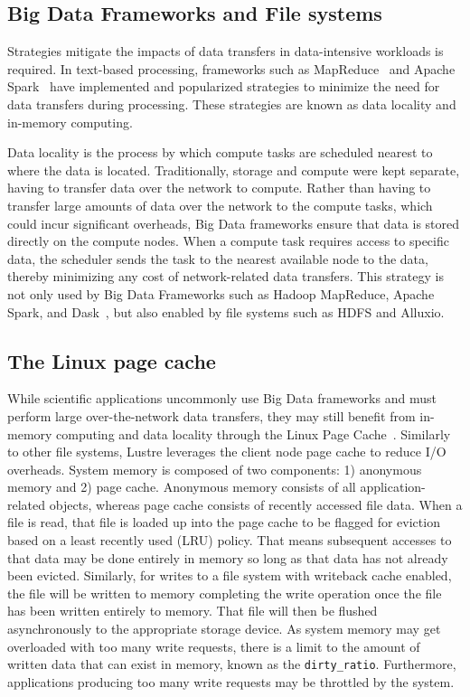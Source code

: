 \documentclass[10pt,journal,compsoc]{IEEEtran}
\begin{document}
\subsection{Big Data Frameworks and File systems}

      Strategies mitigate the impacts of data transfers in data-intensive workloads is
      required. In text-based processing, frameworks such as
      MapReduce~\cite{dean2008mapreduce} and Apache
      Spark~\cite{zaharia2016apache} have implemented and popularized strategies
      to minimize the need for data transfers during processing. These
      strategies are known as data locality and in-memory computing.

      Data locality is the process by which compute tasks are scheduled nearest
      to where the data is located. Traditionally, storage and compute were kept
      separate, having to transfer data over the network to compute. Rather than
      having to transfer large amounts of data over the network to the compute
      tasks, which could incur significant overheads, Big Data frameworks ensure
      that data is stored directly on the compute nodes. When a compute task
      requires access to specific data, the scheduler sends the task to the
      nearest available node to the data, thereby minimizing any cost of
      network-related data transfers. This strategy is not only used by Big Data
      Frameworks such as Hadoop MapReduce, Apache Spark, and
      Dask~\cite{rocklin2015dask}, but also enabled by file systems such as HDFS
      and Alluxio.



\subsection{The Linux page cache}
 While scientific applications uncommonly use Big Data frameworks and must
      perform large over-the-network data transfers, they may still benefit from
      in-memory computing and data locality through the Linux Page
      Cache~\cite{pagecache}. Similarly to other file systems, Lustre leverages
      the client node page cache to reduce I/O overheads. System memory is
      composed of two components: 1) anonymous memory and 2) page cache.
      Anonymous memory consists of all application-related objects, whereas page
      cache consists of recently accessed file data. When a file is read, that
      file is loaded up into the page cache to be flagged for eviction based on
      a least recently used (LRU) policy. That means subsequent accesses to that
      data may be done entirely in memory so long as that data has not already
      been evicted. Similarly, for writes to a file system with writeback cache
      enabled, the file will be written to memory completing the write operation
      once the file has been written entirely to memory. That file will then be
      flushed asynchronously to the appropriate storage device. As system memory
      may get overloaded with too many write requests, there is a limit to the
      amount of written data that can exist in memory, known as the
      \texttt{dirty\_ratio}. Furthermore, applications producing too many write
      requests may be throttled by the system.
\end{document}
